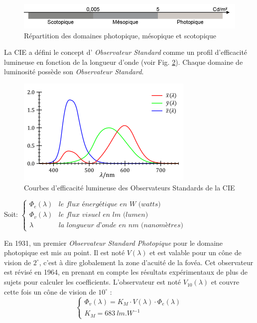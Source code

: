 	\begin{figure}
		\centering
		\includegraphics[scale=1]{Figures/PhotopiqueMesopiqueScotopique}
		\caption{Répartition des domaines photopique, mésopique et scotopique}
		\label{fig:photopic_mesopic_scotopic}
	\end{figure}		
	
	\par La CIE a défini le concept d' \textit{Observateur Standard} comme un profil d'efficacité lumineuse en fonction de la longueur d'onde (voir Fig. \ref{fig:standard_observer_curves}). Chaque domaine de luminosité possède son \textit{Observateur Standard}.
	
	\begin{figure}
		\centering
		\includegraphics[scale=1]{Figures/StandardObsCurves}
		\caption{Courbes d'efficacité lumineuse des Observateurs Standards de la CIE}
		\label{fig:standard_observer_curves}
	\end{figure}
	
	\par Soit: $\begin{cases}
	\Phi_e(\lambda) & \textit{le flux énergétique en W (watts)}\\
	\Phi_v(\lambda) & \textit{le flux visuel en lm (lumen)}\\
	\lambda & \textit{la longueur d'onde en nm (nanomètres)}
	\end{cases}$
	
	\par En 1931, un premier \textit{Observateur Standard Photopique} pour le domaine photopique est mis au point. Il est noté $V(\lambda)$ et est valable pour un cône de vision de $2^\circ$, c'est à dire globalement la zone d'acuité de la fovéa. Cet observateur est révisé en 1964, en prenant en compte les résultats expérimentaux de plus de sujets pour calculer les coefficients. L'observateur est noté $V_{10}(\lambda)$ et couvre cette fois un cône de vision de $10^\circ$ \citep{le_grand_optique_1972, damelincourt_eclairage_2010}:
	\begin{equation}
		\begin{cases}
		\Phi_v(\lambda) = K_M \cdot V(\lambda) \cdot \Phi_e(\lambda)\\
		K_M = 683~lm.W^{-1}
		\end{cases}
		\label{eq:obs_photopic}
	\end{equation}
	
